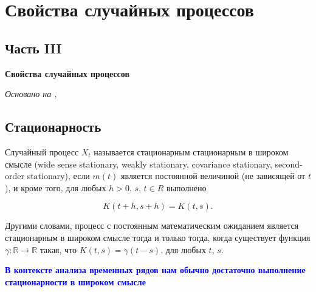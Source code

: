 \chapter{Свойства случайных процессов}
\section*{Часть III} \textbf{Свойства случайных процессов}

\textit{Основано на \cite{adeshereKorrelyaciyaMezhduVremennymi2021},
\cite{panovTeoriyaSluchaynyhProcessov2018}}

\section{Стационарность}
 {
  Случайный процесс \( X_t \) называется
  стационарным стационарным в широком смысле (wide sense stationary,
    weakly stationary, covariance stationary,
  second-order stationary), если $m(t)$ является постоянной величиной
  (не зависящей от $t$), и кроме того, для любых $h > 0$, $s$, $t \in
  R$ выполнено

\[ K(t + h, s + h) = K(t, s). \] }

Другими словами, процесс с постоянным математическим ожиданием
является стационарным в широком смысле тогда и только тогда, когда
существует функция $ \gamma : \mathbb{R} \to \mathbb{R} $ такая, что $
K(t, s) = \gamma(t-s). $ для любых $t$, $s$.

\textcolor{blue}{\textbf{В контексте анализа временных рядов
нам обычно достаточно выполнение стационарности в широком смысле}}

